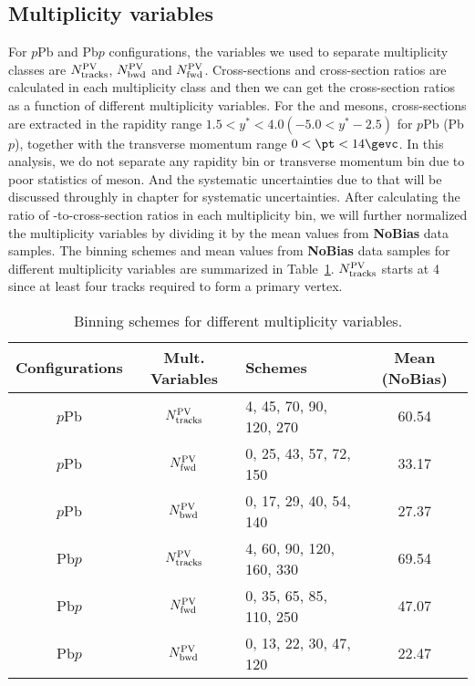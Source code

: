\subsection{Multiplicity variables}
For $p$Pb and Pb$p$ configurations, the variables we used to separate multiplicity classes are $N_{\rm tracks}^{\rm PV}$, $N_{\rm bwd}^{\rm PV}$ and $N_{\rm fwd}^{\rm PV}$. Cross-sections and cross-section ratios are calculated in each multiplicity class and then we can get the cross-section ratios as a function of different multiplicity variables. For the \jpsi and \psitwos mesons, cross-sections are extracted in the rapidity range $1.5 < y^* < 4.0 (-5.0 < y^* -2.5)$ for $p$Pb (Pb$p$), together with the transverse momentum range $0 < \pt < 14\gevc$. In this analysis, we do not separate any rapidity bin or transverse momentum bin due to poor statistics of \psitwos meson. And the systematic uncertainties due to that will be discussed throughly in chapter for systematic uncertainties. After calculating the ratio of \psitwos-to-\jpsi cross-section ratios in each multiplicity bin, we will further normalized the multiplicity variables by dividing it by the mean values from \textbf{NoBias} data samples.
The binning schemes and mean values from \textbf{NoBias} data samples for different multiplicity variables are summarized in Table~\ref{MultiplicityBin}. $N_{\rm tracks}^{\rm PV}$ starts at 4 since at least four tracks required to form a primary vertex. 
\begin{table}[H]
\caption{Binning schemes for different multiplicity variables.}
\begin{center}
\begin{tabular}{c|c|l|c}
\hline
\textbf{Configurations} & \textbf{Mult. Variables} & \textbf{Schemes} & \textbf{Mean (NoBias)}\\
\hline
$p$Pb & $N_{\rm tracks}^{\rm PV}$ & 4, 45, 70, 90, 120, 270 & 60.54\\
\hline
$p$Pb & $N_{\rm fwd}^{\rm PV}$ & 0, 25, 43, 57, 72, 150 & 33.17 \\
\hline
$p$Pb & $N_{\rm bwd}^{\rm PV}$ & 0, 17, 29, 40, 54, 140 & 27.37 \\
\hline
Pb$p$ & $N_{\rm tracks}^{\rm PV}$ & 4, 60, 90, 120, 160, 330 & 69.54\\
\hline
Pb$p$ & $N_{\rm fwd}^{\rm PV}$ & 0, 35, 65, 85, 110, 250 & 47.07\\
\hline
Pb$p$ & $N_{\rm bwd}^{\rm PV}$ & 0, 13, 22, 30, 47, 120 & 22.47\\
\hline
\end{tabular}
\end{center}
\label{MultiplicityBin}
\end{table}

